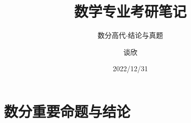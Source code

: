 \documentclass[lang=cn,newtx,12pt,scheme=chinese]{elegantbook}
\title{数学专业考研笔记}
\subtitle{数分高代-结论与真题}
\author{谈欣}
\institute{湖北第二师范学院数学与统计学院}
\date{2022/12/31}
\begin{document}
	
	\maketitle\frontmatter\tableofcontents\mainmatter
	
	\chapter{数分重要命题与结论}\newpage
	
	
	\newpage
	
	
	
	\newpage
	
	\newpage
	\newpage
	\newpage
	
	\newpage
	\newpage
	\newpage
	
	\newpage
	\newpage
	
	\newpage
	\newpage
	\newpage
	
	\newpage
	\newpage
	
	\newpage
	\newpage
	\newpage
	\newpage
	\newpage
	
	\newpage
	
	\newpage
	
	\newpage
	\newpage
	
	\newpage
	\newpage
	\newpage
	
	\newpage
	\newpage
	
	
	


	
	
	
\end{document}
